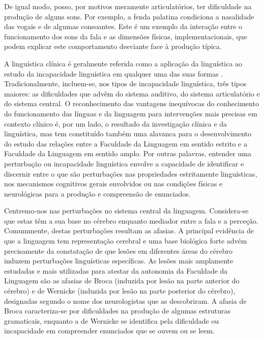 \documentclass[output=paper,colorlinks,citecolor=brown,booklanguage=portuguese]{langscibook}
\begin{document}
De igual modo, posso, por motivos meramente articulatórios, ter dificuldade na produção de alguns sons. Por exemplo, a fenda palatina condiciona a nasalidade das vogais e de algumas consoantes. Este é um exemplo da interação entre o funcionamento dos sons da fala e as dimensões físicas, implementacionais, que podem explicar este comportamento desviante face à produção típica.

A linguística clínica é geralmente referida como a aplicação da linguística ao estudo da incapacidade linguística em qualquer uma das suas formas \citep{Crystal1981}. Tradicionalmente, incluem-se, nos tipos de incapacidade linguística, três tipos maiores: as dificuldades que advêm do sistema auditivo, do sistema articulatório e do sistema central. O reconhecimento das vantagens inequívocas do conhecimento do funcionamento das línguas e da linguagem para intervenções mais precisas em contexto clínico é, por um lado, o resultado da investigação clínica e da linguística, mas tem constituído também uma alavanca para o desenvolvimento do estudo das relações entre a Faculdade da Linguagem em sentido estrito e a Faculdade da Linguagem em sentido amplo. Por outras palavras, entender uma perturbação ou incapacidade linguística envolve a capacidade de identificar e discernir entre o que são perturbações nas propriedades estritamente linguísticas, nos mecanismos cognitivos gerais envolvidos ou nas condições físicas e neurológicas para a produção e compreensão de enunciados.

Centremo-nos nas perturbações no sistema central da linguagem. Considera-se que estas têm a sua base no cérebro enquanto mediador entre a fala e a perceção. Comummente, destas perturbações resultam as afasias.  A principal evidência de que a linguagem tem representação cerebral e uma base biológica forte advém precisamente da constatação de que lesões em diferentes áreas do cérebro induzem perturbações linguísticas específicas. As lesões mais amplamente estudadas e mais utilizadas para atestar da autonomia da Faculdade da Linguagem são as afasias de Broca (induzida por lesão na parte anterior do cérebro) e de Wernicke (induzida por lesão na parte posterior do cérebro), designadas segundo o nome dos neurologistas que as descobriram. A afasia de Broca caracteriza-se por dificuldades na produção de algumas estruturas gramaticais, enquanto a de Wernicke se identifica pela dificuldade ou incapacidade em compreender enunciados que se ouvem ou se leem.
\end{document}
